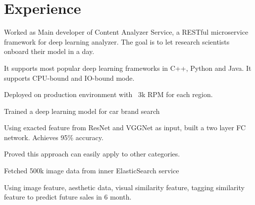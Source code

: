 \documentclass[letterpaper]{deedy-resume} %
\begin{document}
\hfill
%
%
\begin{minipage}[t]{0.66\textwidth} %


\section{Experience}


\sectionspace

\vspace{\topsep} %
\begin{tightitemize}
\item Worked as Main developer of Content Analyzer Service, a RESTful microservice framework for deep learning analyzer. The goal is to let research scientists onboard their model in a day.
\item It supports most popular deep learning frameworks in C++, Python and Java. It supports CPU-bound and IO-bound mode.
\item Deployed on production environment with ~3k RPM for each region.
\end{tightitemize}
\begin{tightitemize}
\item Trained a deep learning model for car brand search
\item Using exacted feature from ResNet and VGGNet as input, built a two layer FC network. Achieves 95\% accuracy.
\item Proved this approach can easily apply to other categories.
\end{tightitemize}
\begin{tightitemize}
\item Fetched 500k image data from inner ElasticSearch service
\item Using image feature, aesthetic data, visual similarity feature, tagging similarity feature to predict future sales in 6 month.
\end{tightitemize}


\end{minipage}
\end{document}
